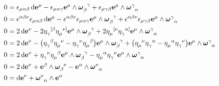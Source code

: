\begin{align*}
    0&=\epsilon_{\mu\alpha\beta}\dd{\vb e^\mu}-\epsilon_{\mu\alpha\gamma}\vb e^\mu\wedge\tensor{\boldsymbol\omega}{_\beta^\gamma}+\epsilon_{\mu\gamma\beta}\vb e^\mu\wedge\tensor{\boldsymbol\omega}{^\gamma_\alpha}\\
    0&=\epsilon^{\alpha\beta\nu}\epsilon_{\mu\alpha\beta}\dd{\vb e^\mu}-\epsilon^{\alpha\beta\nu}\epsilon_{\mu\alpha\gamma}\vb e^\mu\wedge\tensor{\boldsymbol\omega}{_\beta^\gamma}+\epsilon^{\alpha\beta\nu}\epsilon_{\mu\gamma\beta}\vb e^\mu\wedge\tensor{\boldsymbol\omega}{^\gamma_\alpha}\\
    0&=2\dd{\vb e^\nu}-2\tensor{\eta}{_\gamma^{[\beta}}\tensor{\eta}{_\mu^{\nu]}}\vb e^\mu\wedge\tensor{\boldsymbol\omega}{_\beta^\gamma}+2\tensor{\eta}{_\mu^{[\nu}}\tensor{\eta}{_\gamma^{\alpha]}}\vb e^\mu\wedge\tensor{\boldsymbol\omega}{^\gamma_\alpha}\\
    0&=2\dd{\vb e^\nu}-\qty(\tensor{\eta}{_\gamma^{\beta}}\tensor{\eta}{_\mu^{\nu}}-\tensor{\eta}{_\gamma^{\nu}}\tensor{\eta}{_\mu^{\beta}})\vb e^\mu\wedge\tensor{\boldsymbol\omega}{_\beta^\gamma}+\qty(\tensor{\eta}{_\mu^{\nu}}\tensor{\eta}{_\gamma^{\alpha}}-\tensor{\eta}{_\mu^{\alpha}}\tensor{\eta}{_\gamma^{\nu}})\vb e^\mu\wedge\tensor{\boldsymbol\omega}{^\gamma_\alpha}\\
    0&=2\dd{\vb e^\nu}+\tensor{\eta}{_\gamma^{\nu}}\tensor{\eta}{_\mu^{\beta}}\vb e^\mu\wedge\tensor{\boldsymbol\omega}{_\beta^\gamma}-\tensor{\eta}{_\mu^{\alpha}}\tensor{\eta}{_\gamma^{\nu}}\vb e^\mu\wedge\tensor{\boldsymbol\omega}{^\gamma_\alpha}\\
    0&=2\dd{\vb e^\nu}+\vb e^\beta\wedge\tensor{\boldsymbol\omega}{_\beta^\nu}-\vb e^\alpha\wedge\tensor{\boldsymbol\omega}{^\nu_\alpha}\\
    0&=\dd{\vb e^\nu}+\tensor{\boldsymbol\omega}{^\nu_\alpha}\wedge\vb e^\alpha
\end{align*}















